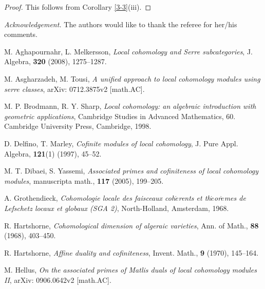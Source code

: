 \documentclass[10pt]{amsart}
\begin{document}
\begin{proof}
This follows from Corollary \ref {3-3}(iii).
\end{proof}
{\it Acknowledgement.} The authors would like to thank the referee
for her/his comments.


\begin{thebibliography}{9}


M. Aghapournahr, L. Melkersson, \emph{Local cohomology and Serre
subcategories}, J. Algebra, \textbf{320} (2008), 1275--1287.


M. Asgharzadeh, M. Tousi, \emph{A unified approach to local
cohomology modules using serre classes}, arXiv: 0712.3875v2
[math.AC].


M. P. Brodmann, R. Y. Sharp, \emph{Local cohomology: an algebraic
introduction with geometric applications}, Cambridge Studies in
Advanced Mathematics, 60. Cambridge University Press, Cambridge,
1998.


D. Delfino, T. Marley, {\it Cofinite modules of local cohomology},
J. Pure Appl. Algebra, {\bf 121}(1) (1997), 45--52.


M. T. Dibaei, S. Yassemi, \emph{Associated primes and cofiniteness
of local cohomology modules}, manuscripta math., \textbf{117}
(2005), 199--205.


A. Grothendieck, {\it Cohomologie locale des faisceaux
coh$\acute{e}$rents et th$\acute{e}$or$\grave{e}$mes de Lefschetz
locaux et globaux (SGA 2)}, North-Holland, Amsterdam, 1968.


R. Hartshorne, \emph{Cohomological dimension of algeraic varieties},
Ann. of Math., \textbf{88} (1968), 403--450.


R. Hartshorne, {\it Affine duality and cofiniteness}, Invent. Math.,
\textbf{9} (1970), 145--164.


M. Hellus, \emph{On the associated primes of Matlis duals of local
cohomology modules II}, arXiv: 0906.0642v2 [math.AC].



\end{thebibliography}
\end{document}
